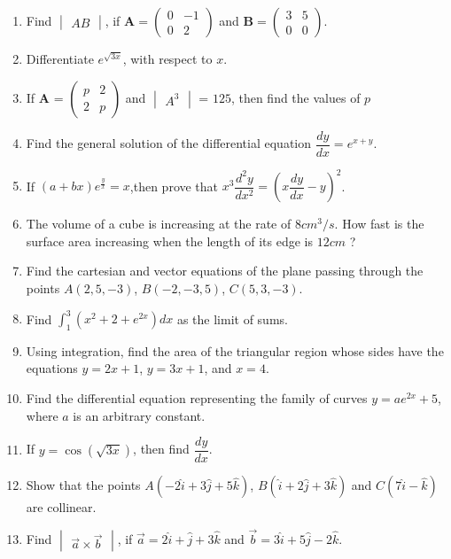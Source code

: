 \documentclass[12pt,-letter paper]{article}
\providecommand{\brak}[1]{\ensuremath{\left(#1\right)}}
\theoremstyle{remark}
\newcommand{\myvec}[1]{\ensuremath{\begin{pmatrix}#1\end{pmatrix}}}
\newcommand{\mydet}[1]{\ensuremath{\begin{vmatrix}#1\end{vmatrix}}}
\let\vec\mathbf
\begin{document}
\begin{enumerate}
\item Find $\mydet{AB}$, if $\vec{A}=\myvec{0&-1 \\ 0&2}$ and $\vec{B}=\myvec{3&5 \\ 0&0}$.

\item Differentiate $e^{\sqrt{3x}}$, with respect to ${x}$.

\item If $\vec{A}$ = $\myvec{p&2 \\ 2&p}$ and $\mydet{A^3}$ = $125$, then find the values of $p$

\item Find the general solution of the differential equation $\dfrac{dy}{dx} = e^{x+y}$.

\item If $\brak{a+bx}e^\frac{y}{x}={x}$,then prove that ${x}^3\dfrac{d^2y}{dx^2}={\brak{x\dfrac{dy}{dx}-{y}}^2}$.

\item The volume of a cube is increasing at the rate of $8 cm^3/s$. How fast is the surface area increasing when the length of its edge is $12 cm$ ?

\item Find the cartesian and vector equations of the plane passing through the points $A$\brak{2,5,-3}, $B$\brak{-2,-3,5}, $C$\brak{5,3,-3}.

\item Find $\int_{1}^{3}{\brak{x^2+2+e^{2x}}}dx$ as the limit of sums.

\item Using integration, find the area of the triangular region whose sides have the equations ${y}={2x}+1$, ${y}={3x}+1$, and ${x}=4$.
         
\item Find the differential equation representing the family of curves ${y}=ae^{2x}+5$, where $a$ is an arbitrary constant.

\item If ${y}=\cos\brak{\sqrt{3x}}$, then find $\dfrac{dy}{dx}$.

 \item Show that the points $A\brak{-2\hat{i}+3\hat{j}+5\hat{k}}$, $B\brak{\hat{i}+2\hat{j}+3\hat{k}}$ and $C\brak{7\hat{i}-\hat{k}}$ are collinear.
 
 \item Find $\mydet{\overrightarrow{a}\times\overrightarrow{b}}$, if $\overrightarrow{a}=2\hat{i}+\hat{j}+3\hat{k}$ and $\overrightarrow{b}=3\hat{i}+5\hat{j}-2\hat{k}$.
 

\end{enumerate}
\end{document}
